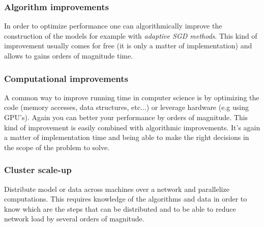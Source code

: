 \subsubsection{Algorithm improvements}
In order to optimize performance one can algorithmically improve the construction of the models for example with \emph{adaptive SGD methods}. This kind of improvement usually comes for free (it is only a matter of implementation) and allows to gains orders of magnitude time.

\subsubsection{Computational improvements}
A common way to improve running time in computer science is by optimizing the code (memory accesses, data structures, etc...) or leverage hardware (e.g using GPU's). Again you can better your performance by orders of magnitude. This kind of improvement is easily combined with algorithmic improvements. It's again a matter of implementation time and being able to make the right decisions in the scope of the problem to solve.

\subsubsection{Cluster scale-up}
Distribute model or data across machines over a network and parallelize computations. This requires knowledge of the algorithms and data in order to know which are the steps that can be distributed and to be able to reduce network load by several orders of magnitude. 